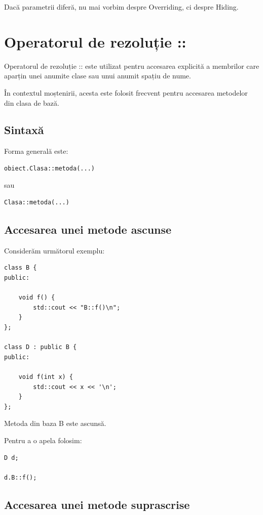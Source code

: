 \documentclass[12pt,a4paper]{article}
\begin{document}
Dacă parametrii diferă, nu mai vorbim despre Overriding, ci despre Hiding.






\section{Operatorul de rezoluție ::}

Operatorul de rezoluție :: este utilizat pentru accesarea explicită a membrilor care aparțin unei anumite clase sau unui anumit spațiu de nume.

În contextul moștenirii, acesta este folosit frecvent pentru accesarea metodelor din clasa de bază.

\subsection{Sintaxă}

Forma generală este:

\begin{verbatim}
obiect.Clasa::metoda(...)
\end{verbatim}

sau

\begin{verbatim}
Clasa::metoda(...)
\end{verbatim}

\subsection{Accesarea unei metode ascunse}

Considerăm următorul exemplu:

\begin{verbatim}
class B {
public:

    void f() {
        std::cout << "B::f()\n";
    }
};

class D : public B {
public:

    void f(int x) {
        std::cout << x << '\n';
    }
};
\end{verbatim}

Metoda din baza B este ascunsă.

Pentru a o apela folosim:

\begin{verbatim}
D d;

d.B::f();
\end{verbatim}

\subsection{Accesarea unei metode suprascrise}
\end{document}

